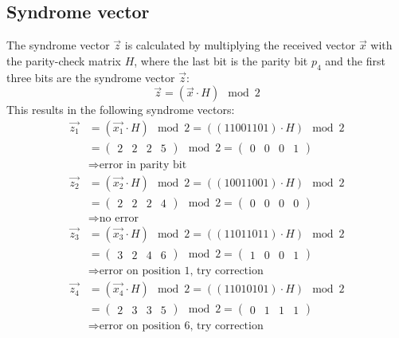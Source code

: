 \subsection*{Syndrome vector}
The syndrome vector $\vec{z}$ is calculated by multiplying the received vector $\vec{x}$ with the parity-check matrix $H$, where the last bit is the parity bit $p_4$ and the first three bits are the syndrome vector $\vec{z}$:
\begin{equation*}
  \vec{z} = (\vec{x} \cdot H) \mod 2
\end{equation*}
This results in the following syndrome vectors:
\begin{align*}
  \vec{z_1} & = (\vec{x_1} \cdot H) \mod 2 = ((11001101) \cdot H) \mod 2\\
   &= \begin{pmatrix}2 &2 &2 &5\end{pmatrix} \mod 2 = \begin{pmatrix}0 &0 &0 &1\end{pmatrix}\\
   & \Rightarrow \text{error in parity bit}\\
  \vec{z_2} & = (\vec{x_2} \cdot H) \mod 2 = ((10011001) \cdot H) \mod 2\\
   &= \begin{pmatrix}2 &2 &2 &4\end{pmatrix} \mod 2 = \begin{pmatrix}0 &0 &0 &0\end{pmatrix}\\
   & \Rightarrow \text{no error}\\
  \vec{z_3} & = (\vec{x_3} \cdot H) \mod 2 = ((11011011) \cdot H) \mod 2\\
   &= \begin{pmatrix}3 &2 &4 &6\end{pmatrix} \mod 2 = \begin{pmatrix}1 &0 &0 &1\end{pmatrix}\\
   & \Rightarrow \text{error on position 1, try correction}\\
  \vec{z_4} & = (\vec{x_4} \cdot H) \mod 2 = ((11010101) \cdot H) \mod 2\\
   &= \begin{pmatrix}2 &3 &3 &5\end{pmatrix} \mod 2 = \begin{pmatrix}0 &1 &1 &1\end{pmatrix}\\
   & \Rightarrow \text{error on position 6, try correction}\\
\end{align*}

